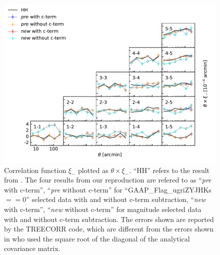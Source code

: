 \documentclass[fleqn,usenatbib]{mnras}
\begin{document}
\begin{figure}
    \centering
    \includegraphics{compare_xim.pdf}
    \caption{Correlation function $\xi_-$ plotted as $\theta\times\xi_-$. ``HH'' refers to the result from \citet{2018arXiv181206076H}. The four results from our reproduction are refered to as ``{\it pre} with c-term'', ``{\it pre} without c-term'' for ``GAAP\_Flag\_ugriZYJHKs $==0$'' selected data with and without c-term subtraction, ``{\it new} with c-term'', ``{\it new} without c-term'' for magnitude selected data with and without c-term subtraction. The errors shown are reported by the TREECORR code, which are different from the errors shown in \citet{2018arXiv181206076H} who used the square root of the diagonal of the analytical covariance matrix. }    \label{fig:xim}
\end{figure}








\end{document}
